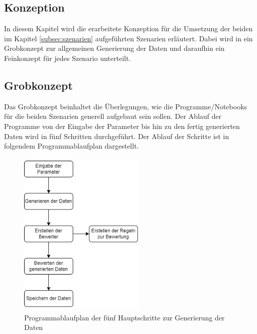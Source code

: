 \begin{onehalfspace}
\section{Konzeption}
\label{subsection:konzeption}
In diesem Kapitel wird die erarbeitete Konzeption für die Umsetzung der beiden im Kapitel \ref*{subsec:szenarien} aufgeführten Szenarien erläutert. Dabei wird in ein Grobkonzept zur allgemeinen Generierung der Daten und daraufhin ein Feinkonzept für jedes Szenario unterteilt.
\subsection{Grobkonzept}
\label{subsubsec:grobkonzept}
Das Grobkonzept beinhaltet die Überlegungen, wie die Programme/Notebooks für die beiden Szenarien generell aufgebaut sein sollen. Der Ablauf der Programme von der Eingabe der Parameter bis hin zu den fertig generierten Daten wird in fünf Schritten durchgeführt. Der Ablauf der Schritte ist in folgendem Programmablaufplan dargestellt.\\
\begin{figure}[h]
    \centering
    \includegraphics[width=6cm,height=8cm]{Diagramme/Grobkonzept_PAP.jpg}
    \caption{Programmablaufplan der fünf Hauptschritte zur Generierung der Daten}
    \label{fig:GrobkonzeptPAP}
\end{figure}\\

\end{onehalfspace}
